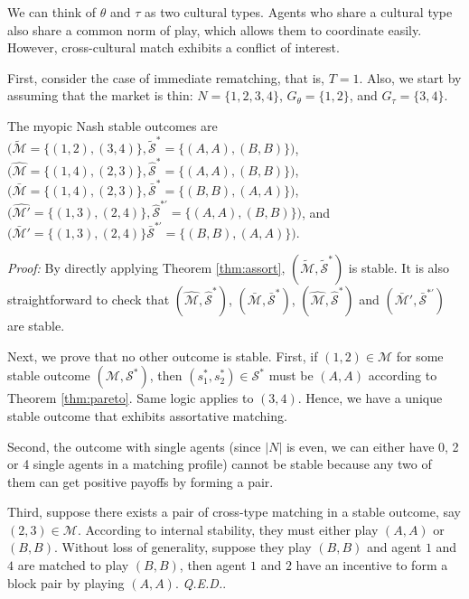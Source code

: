 \documentclass{myPaper}
\begin{document}
We can think of $\theta$ and $\tau$ as two cultural types. Agents who share a cultural type also share a common norm of play, which allows them to coordinate easily. However, cross-cultural match exhibits a conflict of interest.

First, consider the case of immediate rematching, that is, $T=1$. Also, we start by assuming that the market is thin: $N=\{1, 2, 3, 4\}$, $G_\theta=\{1, 2\}$, and $G_\tau=\{3, 4\}$. 

\begin{proposition} \label{prop: thin, T=1}
The myopic Nash stable outcomes are $\big(\tilde{\mathcal{M}}=\{(1, 2), (3, 4)\}, \tilde{\mathcal{S}}^*=\{(A, A), (B, B)\}\big)$, $\big(\hat{\mathcal{M}}=\{(1, 4), (2, 3)\}, \hat{\mathcal{S}}^*=\{(A, A), (B, B)\}\big)$, $\big(\bar{\mathcal{M}}=\{(1, 4), (2, 3)\}, \bar{\mathcal{S}}^*=\{(B, B), (A, A)\}\big)$, 
$\big(\hat{\mathcal{M}'}=\{(1, 3), (2, 4)\}, \hat{\mathcal{S}}^{*'}=\{(A, A), (B, B)\}\big)$, and $\big(\bar{\mathcal{M}}'=\{(1, 3), (2, 4)\} \bar{\mathcal{S}}^{*'}=\{(B, B), (A, A)\}\big)$.

\end{proposition}
\noindent \textit{Proof:} By directly applying Theorem \ref{thm:assort}, $(\tilde{\mathcal{M}}, \tilde{\mathcal{S}}^*)$ is stable. It is also straightforward to check that $(\hat{\mathcal{M}}, \hat{\mathcal{S}}^*)$, $(\bar{\mathcal{M}}, \bar{\mathcal{S}}^{*})$, $(\hat{\mathcal{M}}, \hat{\mathcal{S}}^*)$ and $(\bar{\mathcal{M}}', \bar{\mathcal{S}}^{*'})$ are stable.

Next, we prove that no other outcome is stable. First, if $(1, 2) \in \mathcal{M}$ for some stable outcome $(\mathcal{M}, \mathcal{S}^*)$, then $(s_1^*, s_2^*) \in \mathcal{S}^*$ must be $(A, A)$ according to Theorem \ref{thm:pareto}. Same logic applies to $(3, 4)$. Hence, we have a unique stable outcome that exhibits assortative matching. 

Second, the outcome with single agents (since $|N|$ is even, we can either have 0, 2 or 4 single agents in a matching profile) cannot be stable because any two of them can get positive payoffs by forming a pair.

Third, suppose there exists a pair of cross-type matching in a stable outcome, say $(2, 3) \in \mathcal{M}$. According to internal stability, they must either play $(A, A)$ or $(B, B)$. %
Without loss of generality, suppose they play $(B, B)$ and agent $1$ and $4$ are matched to play $(B, B)$, then agent $1$ and $2$ have an incentive to form a block pair by playing $(A, A)$. \textit{Q.E.D.}.
\\
\end{document}
